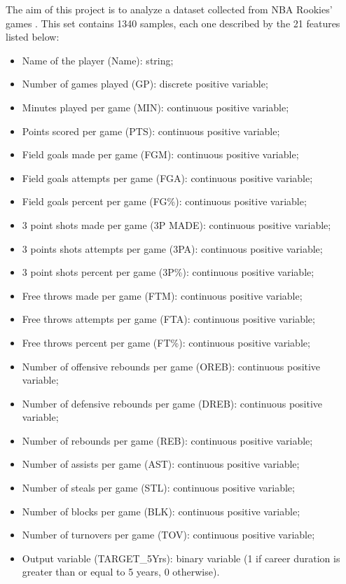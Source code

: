 The aim of this project is to analyze a dataset collected from NBA Rookies' games \cite{NBARS:2016}. This set contains 1340 samples, each one described by the 21 features listed below: 
\begin{itemize}
	\item Name of the player (Name): string;
	\item Number of games played (GP): discrete positive variable;
	\item Minutes played per game (MIN): continuous positive variable;
	\item Points scored per game (PTS): continuous positive variable;
	\item Field goals made per game (FGM): continuous positive variable;
	\item Field goals attempts per game (FGA): continuous positive  variable;
	\item Field goals percent per game (FG\%): continuous positive variable;
	\item 3 point shots made per game (3P MADE): continuous positive variable;
	\item 3 points shots attempts per game (3PA): continuous positive variable;
	\item 3 point shots percent per game (3P\%): continuous positive variable;
	\item Free throws made per game (FTM): continuous positive variable;
	\item Free throws attempts per game (FTA): continuous positive variable;
	\item Free throws percent per game (FT\%): continuous positive variable;
	\item Number of offensive rebounds per game (OREB): continuous positive variable;
	\item Number of defensive rebounds per game (DREB): continuous positive variable;
	\item Number of rebounds per game (REB): continuous positive variable;
	\item Number of assists per game (AST): continuous positive variable;
	\item Number of steals per game (STL): continuous positive variable;
	\item Number of blocks per game (BLK): continuous positive variable;
	\item Number of turnovers per game (TOV): continuous positive variable;
	\item Output variable (TARGET\_5Yrs): binary variable (1 if career duration is greater than or equal to 5 years, 0 otherwise).\\
\end{itemize} 

